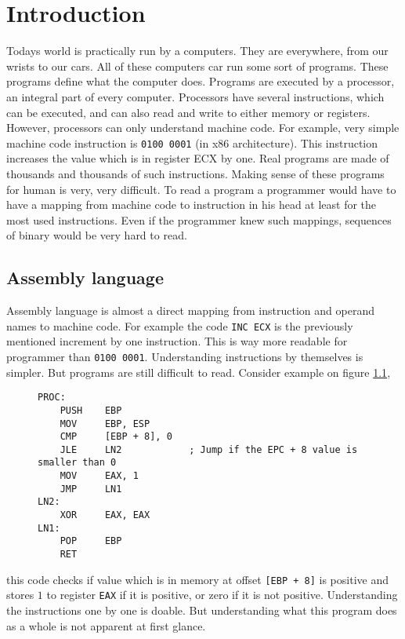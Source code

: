 \chapter{Introduction}
Todays world is practically run by a computers. They are everywhere, from our wrists to our cars.
All of these computers car run some sort of programs. These programs define what the computer does.
Programs are executed by a processor, an integral part of every computer. Processors have several instructions,
which can be executed, and can also read and write to either memory or registers. However, processors can only
understand machine code. For example, very simple machine code instruction is \texttt{0100 0001} (in x86 architecture).
This instruction increases the value which is in register ECX by one. Real programs are made of thousands and thousands of
such instructions. Making sense of these programs for human is very, very difficult. To read a program a programmer would
have to have a mapping from machine code to instruction in his head at least for the most used instructions. Even if the
programmer knew such mappings, sequences of binary would be very hard to read. 

\section{Assembly language}
Assembly language is almost a direct mapping from instruction and operand names to machine code. For example the code \texttt{INC ECX}
is the previously mentioned increment by one instruction. This is way more readable for programmer than \texttt{0100 0001}.
Understanding instructions by themselves is simpler. But programs are still difficult to read. Consider example on figure \ref{fig:assembly-example},
\begin{figure}\label{fig:assembly-example}
\begin{lstlisting}
PROC:
    PUSH    EBP
    MOV     EBP, ESP
    CMP     [EBP + 8], 0
    JLE     LN2            ; Jump if the EPC + 8 value is smaller than 0
    MOV     EAX, 1
    JMP     LN1
LN2:
    XOR     EAX, EAX
LN1:
    POP     EBP
    RET
\end{lstlisting}
\end{figure}
this code checks if value which is in memory at offset \texttt{[EBP + 8]} is positive and stores $1$ to register \texttt{EAX} if it is positive, or zero if it is not positive. Understanding the instructions one by one is doable. But understanding what this program does as a whole is not apparent at first glance. 

